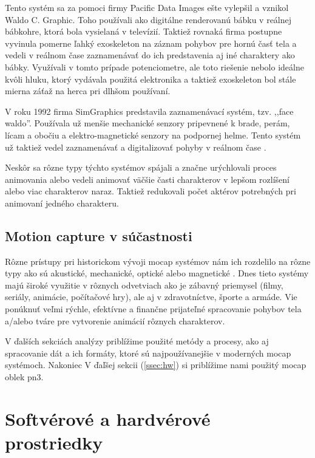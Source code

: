 Tento systém sa za pomoci firmy Pacific Data Images ešte vylepšil a vznikol Waldo C. Graphic. Toho používali ako digitálne renderovanú bábku v reálnej bábkohre, ktorá bola vysielaná v televízií. Taktiež rovnaká firma postupne vyvinula pomerne ľahký exoskeleton na záznam pohybov pre hornú časť tela a vedeli v reálnom čase zaznamenávať do ich predstavenia aj iné charaktery ako bábky. Využívali v tomto prípade potenciometre, ale toto riešenie nebolo ideálne kvôli hluku, ktorý vydávala použitá elektronika a taktiež exoskeleton bol stále mierna záťaž na herca pri dlhšom používaní.

V roku 1992 firma SimGraphics predstavila zaznamenávací systém, tzv. ,,face waldo''. Používala už menšie mechanické senzory pripevnené k brade, perám, lícam a obočiu a elektro-magnetické senzory na podpornej helme. Tento systém už taktiež vedel zaznamenávať a digitalizovať pohyby v reálnom čase \cite{mocapHistory}.

Neskôr sa rôzne typy týchto systémov spájali a značne urýchlovali proces animovania alebo vedeli animovať väčšie časti charakterov v lepšom rozlíšení alebo viac charakterov naraz. Taktiež redukovali počet aktérov potrebných pri animovaní jedného charakteru.

\subsection{Motion capture v súčastnosti}%

Rôzne prístupy pri historickom vývoji mocap systémov nám ich rozdelilo na rôzne typy ako sú akustické, mechanické, optické alebo magnetické \cite{mocapFundamentals}.
Dnes tieto systémy majú široké využitie v rôznych odvetviach ako je zábavný priemysel (filmy, seriály, animácie, počítačové hry), ale aj v zdravotníctve, športe a armáde. Vie ponúknuť veľmi rýchle, efektívne a finančne prijateľné spracovanie pohybov tela a/alebo tváre pre vytvorenie animácií rôznych charakterov. 

V ďalších sekciách analýzy priblížime použité metódy a procesy, ako aj spracovanie dát a ich formáty, ktoré sú najpoužívanejšie v moderných mocap systémoch. Nakoniec 
V ďaľšej sekcii (\ref{ssec:hw}) si priblížime nami použitý mocap oblek \acrfull{pn3}.

\section{Softvérové a hardvérové prostriedky}%


